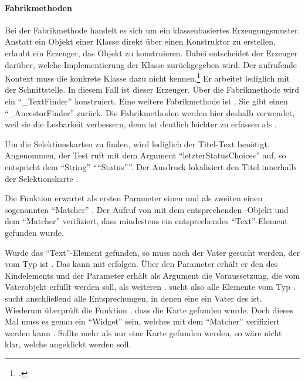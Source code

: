\paragraph{Fabrikmethoden}
Bei der Fabrikmethode handelt es sich um ein klassenbasiertes Erzeugungsmuster.
Anstatt ein Objekt einer Klasse direkt über einen Konstruktor zu erstellen,
erlaubt ein Erzeuger, das Objekt zu konstruieren.
Dabei entscheidet der Erzeuger darüber,
welche Implementierung der Klasse zurückgegeben wird.
Der aufrufende Kontext muss die konkrete Klasse dazu nicht kennen.\footcite[Vgl.][107-116]{gamma2009entwurfsmuster} Er arbeitet lediglich mit der Schnittstelle.
In diesem Fall ist  dieser Erzeuger.
Über die Fabrikmethode  wird ein \enquote{_TextFinder} konstruiert.
Eine weitere Fabrikmethode ist .
Sie gibt einen \enquote{_AncestorFinder} zurück.
Die Fabrikmethoden werden hier deshalb verwendet, weil sie die Lesbarkeit verbessern,
denn  ist  deutlich leichter zu erfassen als
.



Um die Selektionskarten zu finden, wird lediglich der Titel-Text benötigt.
Angenommen, der Test ruft  mit dem Argument \enquote{letzterStatusChoices} auf,
so entspricht  dem \enquote{String} \enquote{``Status''}.
Der Ausdruck  lokalisiert den Titel innerhalb der Selektionskarte .

Die Funktion  erwartet als ersten Parameter einen  und als zweiten einen sogenannten \enquote{Matcher} .
Der Aufruf von  mit dem entsprechenden -Objekt und dem \enquote{Matcher}  verifiziert,
dass mindestens ein entsprechendes \enquote{Text}-Element gefunden wurde.

Wurde das \enquote{Text}-Element gefunden, so muss noch der Vater gesucht werden, der vom Typ  ist .
Das kann mit  erfolgen.
Über den Parameter  erhält er den  des Kindelements und der Parameter  erhält als Argument die Voraussetzung, die vom Vaterobjekt erfüllt werden soll,
als weiteren .
 sucht also alle Elemente vom Typ .
 sucht anschließend alle Entsprechungen, in denen eine  ein Vater des  ist.
Wiederum überprüft die Funktion ,
dass die Karte gefunden wurde.
Doch dieses Mal muss es genau ein \enquote{Widget} sein, welches mit dem \enquote{Matcher}  verifiziert werden kann .
Sollte mehr als nur eine Karte gefunden werden, so wäre nicht klar, welche angeklickt werden soll.

